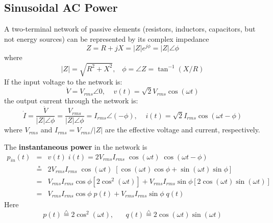 

\subsection*{Sinusoidal AC Power}

A two-terminal network of passive elements (resistors, inductors, 
capacitors, but not energy sources) can be represented by its complex 
impedance 
\[	Z=R+jX=|Z|e^{j\phi}=|Z|\angle \phi \]
where 
\[	|Z|=\sqrt{R^2+X^2},\;\;\;\phi=\angle Z=\tan^{-1}(X/R) \]
If the input voltage to the network is:
\[ \dot{V}=V_{rms}\angle 0,\;\;\;\;v(t)=\sqrt{2}V_{rms} \cos(\omega t) \]
the output current through the network is:
\[ \dot{I}=\frac{\dot{V}}{|Z|\angle \phi}=\frac{V_{rms}}{|Z|\angle \phi}=
I_{rms}\angle(-\phi),\;\;\;\;i(t)=\sqrt{2}I_{rms} \cos(\omega t-\phi)  \]
where $V_{rms}$ and $I_{rms}=V_{rms}/|Z|$ are the effective voltage and 
current, respectively.

The {\bf instantaneous power} in the network is
\begin{eqnarray}
p_{in}(t) &=& v(t)\;i(t)=2V_{rms}I_{rms}\;\cos(\omega t)\;\cos(\omega t-\phi)
	\nonumber \\
&\stackrel{*}{=}&2V_{rms}I_{rms}\;\cos(\omega t)\;[\cos(\omega t)\cos\phi
	+\sin(\omega t)\sin\phi ]	\nonumber \\
&=&V_{rms}I_{rms}\cos\phi [2\cos^2(\omega t)]
	+V_{rms}I_{rms}\sin\phi [2\cos(\omega t)\sin(\omega t)] \nonumber \\
&=&V_{rms}I_{rms}\cos\phi\; p(t)+V_{rms}I_{rms}\sin\phi\; q(t)	\nonumber 
\end{eqnarray}
Here
\[ 	p(t)\stackrel{\triangle}{=}2\cos^2(\omega t),\;\;\;\;\;\;
	q(t)\stackrel{\triangle}{=}2\cos(\omega t)\sin(\omega t) \]

